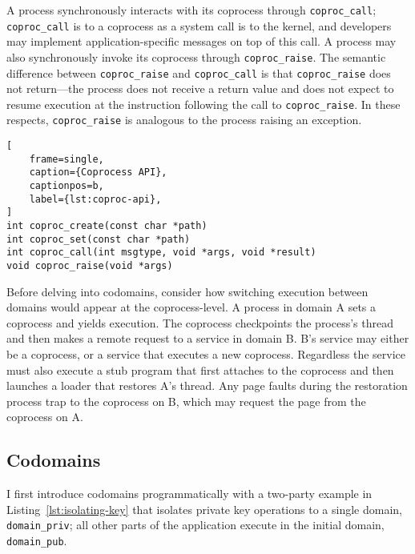 A process synchronously interacts with its coprocess through
\texttt{coproc\_call}; \texttt{coproc\_call} is to a coprocess as a system call
is to the kernel, and developers may implement application-specific messages
on top of this call.
%
A process may also synchronously invoke its coprocess through
\texttt{coproc\_raise}.
%
The semantic difference between \texttt{coproc\_raise} and
\texttt{coproc\_call} is that \texttt{coproc\_raise} does not return---the
process does not receive a return value and does not expect to resume
execution at the instruction following the call to \texttt{coproc\_raise}.
%
In these respects, \texttt{coproc\_raise} is analogous to the process raising
an exception.

\begin{lstlisting}[
    frame=single, 
    caption={Coprocess API},
    captionpos=b,
    label={lst:coproc-api},
]
int coproc_create(const char *path)
int coproc_set(const char *path)
int coproc_call(int msgtype, void *args, void *result)
void coproc_raise(void *args)
\end{lstlisting}


%


%
Before delving into codomains, consider how switching execution between domains
would appear at the coprocess-level.
%
A process in domain A sets a coprocess and yields execution.
%
The coprocess checkpoints the process's thread and then makes a remote request
to a service in domain B\@.
%
B's service may either be a coprocess, or a service that executes a new
coprocess.
%
Regardless the service must also execute a stub program that first attaches to the
coprocess and then launches a loader that restores A's thread.
%
Any page faults during the restoration process trap to the coprocess on B,
which may request the page from the coprocess on A.


\subsection{Codomains}

I first introduce codomains programmatically with a two-party example in
Listing~\ref{lst:isolating-key} that isolates private key operations to a
single domain, \texttt{domain\_priv}; all other parts of the application
execute in the initial domain, \texttt{domain\_pub}.

